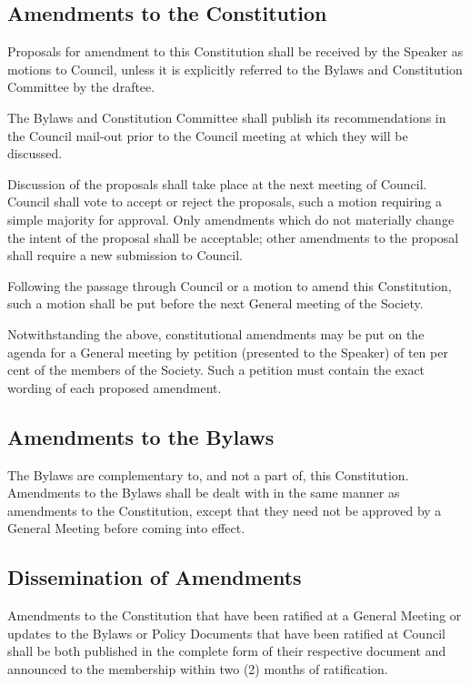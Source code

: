 \subsection {Amendments to the Constitution}
	\begin{longenum}[label*=\arabic*., align=left]
	\item Proposals for amendment to this Constitution shall be received by the Speaker as motions to Council, unless it is explicitly referred to the Bylaws and Constitution Committee by the draftee.
    \item The Bylaws and Constitution Committee shall publish its recommendations in the Council mail-out prior to the Council meeting at which they will be discussed.
    \item Discussion of the proposals shall take place at the next meeting of Council. Council shall vote to accept or reject the proposals, such a motion requiring a simple majority for approval. Only amendments which do not materially change the intent of the proposal shall be acceptable; other amendments to the proposal shall require a new submission to Council.
    \item Following the passage through Council or a motion to amend this Constitution, such a motion shall be put before the next General meeting of the Society. 
    \item Notwithstanding the above, constitutional amendments may be put on the agenda for a General meeting by petition (presented to the Speaker) of ten per cent of the members of the Society. Such a petition must contain the exact wording of each proposed amendment.
\end{longenum}
\subsection {Amendments to the Bylaws}
	\begin{longenum}[label*=\arabic*., align=left]
	\item The Bylaws are complementary to, and not a part of, this Constitution. Amendments to the Bylaws shall be dealt with in the same manner as amendments to the Constitution, except that they need not be approved by a General Meeting before coming into effect.
\end{longenum}
\subsection{Dissemination of Amendments}
	\begin{longenum}[label*=\arabic*., align=left]
	\item Amendments to the Constitution that have been ratified at a General Meeting or updates to the Bylaws or Policy Documents that have been ratified at Council shall be both published in the complete form of their respective document and announced to the membership within two (2) months of ratification.
\end{longenum}
\newpage

